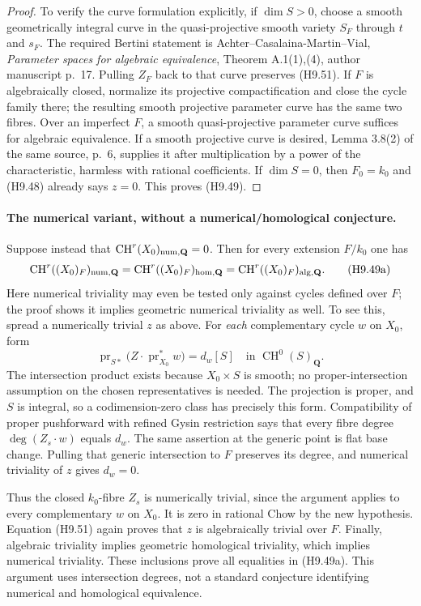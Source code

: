 \documentclass[11pt,a4paper]{article}
\begin{document}
\begin{proof}
To verify the curve formulation explicitly, if $\dim S>0$, choose
a smooth geometrically integral curve in the quasi-projective smooth
variety $S_F$ through $t$ and $s_F$. The required Bertini statement
is Achter--Casalaina-Martin--Vial, \emph{Parameter spaces for
algebraic equivalence}, Theorem A.1(1),(4), author manuscript p.~17.
Pulling $Z_F$ back to that curve preserves (H9.51). If $F$ is
algebraically closed, normalize its projective compactification and
close the cycle family there; the resulting smooth projective
parameter curve has the same two fibres. Over an imperfect $F$, a
smooth quasi-projective parameter curve suffices for algebraic
equivalence. If a smooth projective curve is desired, Lemma 3.8(2)
of the same source, p.~6, supplies it after multiplication by a power
of the characteristic, harmless with rational coefficients. If
$\dim S=0$, then $F_0=k_0$ and (H9.48) already says $z=0$.
This proves (H9.49).
\end{proof}

\paragraph{The numerical variant, without a numerical/homological conjecture.}
Suppose instead that
$\operatorname{CH}^r(X_0)_{\rm num,\mathbf Q}=0$.
Then for every extension $F/k_0$ one has
\[
 \operatorname{CH}^r((X_0)_F)_{\rm num,\mathbf Q}
   =\operatorname{CH}^r((X_0)_F)_{\rm hom,\mathbf Q}
   =\operatorname{CH}^r((X_0)_F)_{\rm alg,\mathbf Q}.         \tag{H9.49a}
\]
Here numerical triviality may even be tested only against cycles
defined over $F$; the proof shows it implies geometric numerical
triviality as well. To see this, spread a numerically trivial $z$
as above. For \emph{each} complementary cycle $w$ on $X_0$, form
\[
 \operatorname{pr}_{S*}
       \bigl(Z\cdot\operatorname{pr}_{X_0}^*w\bigr)
       =d_w[S]\quad\text{in }\operatorname{CH}^0(S)_{\mathbf Q}.
\]
The intersection product exists because $X_0\times S$ is smooth;
no proper-intersection assumption on the chosen representatives is
needed. The projection is proper, and $S$ is integral, so a
codimension-zero class has precisely this form. Compatibility of
proper pushforward with refined Gysin restriction says that every
fibre degree $\deg(Z_s\cdot w)$ equals $d_w$. The same assertion
at the generic point is flat base change. Pulling that generic
intersection to $F$ preserves its degree, and numerical triviality
of $z$ gives $d_w=0$.

Thus the closed $k_0$-fibre $Z_s$ is numerically trivial, since the
argument applies to every complementary $w$ on $X_0$. It is zero
in rational Chow by the new hypothesis. Equation (H9.51) again
proves that $z$ is algebraically trivial over $F$. Finally,
algebraic triviality implies geometric homological triviality,
which implies numerical triviality. These inclusions prove all
equalities in (H9.49a). This argument uses intersection degrees,
not a standard conjecture identifying numerical and homological
equivalence.
\end{document}

